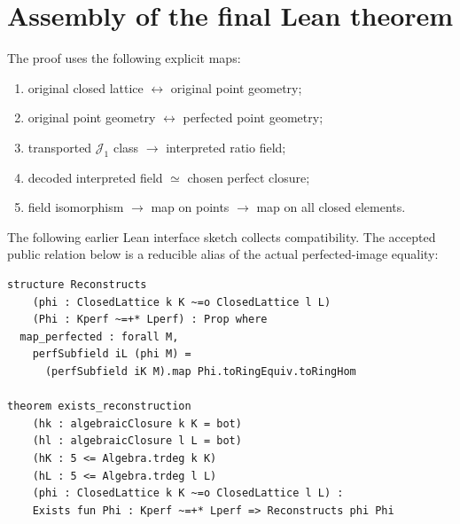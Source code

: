 \documentclass[11pt,oneside]{article}
\theoremstyle{definition}
\theoremstyle{remark}
\newcommand{\Jrel}{\mathcal{J}}
\begin{document}
\section{Assembly of the final Lean theorem}

The proof uses the following explicit maps:

\begin{enumerate}[leftmargin=9mm]
\item original closed lattice $\leftrightarrow$ original point geometry;
\item original point geometry $\leftrightarrow$ perfected point geometry;
\item transported $\Jrel_1$ class $\to$ interpreted ratio field;
\item decoded interpreted field $\simeq$ chosen perfect closure;
\item field isomorphism $\to$ map on points $\to$ map on all closed elements.
\end{enumerate}

The following earlier Lean interface sketch collects compatibility. The accepted
public relation below is a reducible alias of the actual perfected-image equality:

\begin{lstlisting}
structure Reconstructs
    (phi : ClosedLattice k K ~=o ClosedLattice l L)
    (Phi : Kperf ~=+* Lperf) : Prop where
  map_perfected : forall M,
    perfSubfield iL (phi M) =
      (perfSubfield iK M).map Phi.toRingEquiv.toRingHom

theorem exists_reconstruction
    (hk : algebraicClosure k K = bot)
    (hl : algebraicClosure l L = bot)
    (hK : 5 <= Algebra.trdeg k K)
    (hL : 5 <= Algebra.trdeg l L)
    (phi : ClosedLattice k K ~=o ClosedLattice l L) :
    Exists fun Phi : Kperf ~=+* Lperf => Reconstructs phi Phi
\end{lstlisting}
\end{document}
